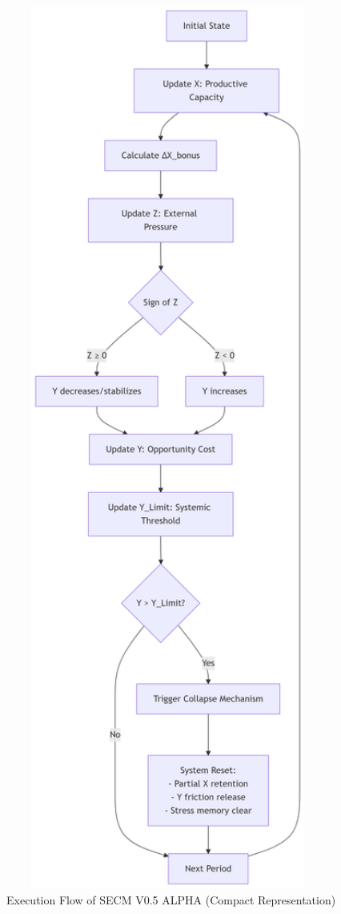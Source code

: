 \documentclass[12pt,a4paper]{article}
\begin{document}
\begin{figure}[h]
    \centering
    \includegraphics[width=0.95\textwidth]{secm_flowchart.png}
    \caption{Execution Flow of SECM V0.5 ALPHA (Compact Representation)}
    \label{fig:flowchart}
\end{figure}
\end{document}
